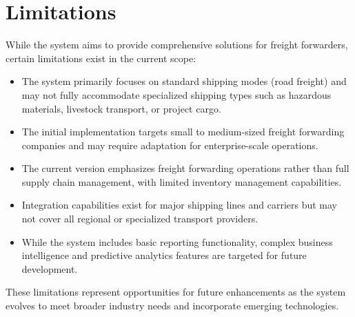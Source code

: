 \section{Limitations}

While the system aims to provide comprehensive solutions for freight forwarders, certain limitations exist in the current scope:

\begin{itemize}
    \item The system primarily focuses on standard shipping modes (road freight) and may not fully accommodate specialized shipping types such as hazardous materials, livestock transport, or project cargo.
    \item The initial implementation targets small to medium-sized freight forwarding companies and may require adaptation for enterprise-scale operations.
    \item The current version emphasizes freight forwarding operations rather than full supply chain management, with limited inventory management capabilities.
    \item Integration capabilities exist for major shipping lines and carriers but may not cover all regional or specialized transport providers.
    \item While the system includes basic reporting functionality, complex business intelligence and predictive analytics features are targeted for future development.
\end{itemize}

These limitations represent opportunities for future enhancements as the system evolves to meet broader industry needs and incorporate emerging technologies.